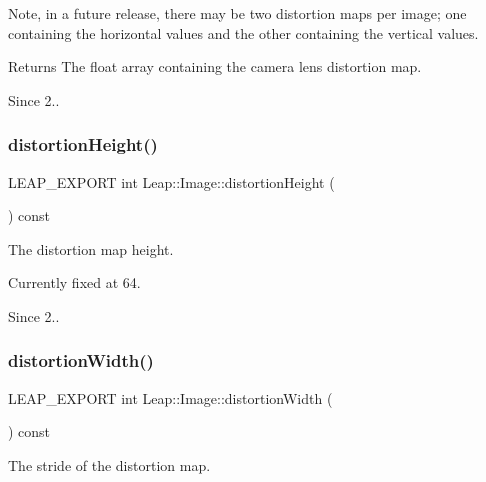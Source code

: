 Note, in a future release, there may be two distortion maps per image; one containing the horizontal values and the other containing the vertical values.

\begin{DoxyReturn}{Returns}
The float array containing the camera lens distortion map. 
\end{DoxyReturn}
\begin{DoxySince}{Since}
2.. 
\end{DoxySince}
\mbox{\label{class_leap_1_1_image_a151e6f3bf58e7b7e2f54d8620c440c1c}} 
\subsubsection{\texorpdfstring{distortion\+Height()}{distortionHeight()}}
{\footnotesize\ttfamily L\+E\+A\+P\+\_\+\+E\+X\+P\+O\+RT int Leap\+::\+Image\+::distortion\+Height (\begin{DoxyParamCaption}{ }\end{DoxyParamCaption}) const}

The distortion map height.

Currently fixed at 64.


\begin{DoxyCodeInclude}
\end{DoxyCodeInclude}


\begin{DoxySince}{Since}
2.. 
\end{DoxySince}
\mbox{\label{class_leap_1_1_image_a8199bd54d44ad2f47f87c1672fae6fbc}} 
\subsubsection{\texorpdfstring{distortion\+Width()}{distortionWidth()}}
{\footnotesize\ttfamily L\+E\+A\+P\+\_\+\+E\+X\+P\+O\+RT int Leap\+::\+Image\+::distortion\+Width (\begin{DoxyParamCaption}{ }\end{DoxyParamCaption}) const}

The stride of the distortion map.

